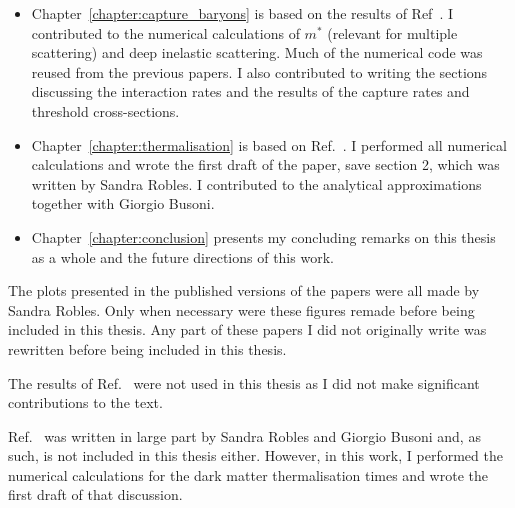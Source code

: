 \begin{preface}
\begin{itemize}
    \item Chapter~\ref{chapter:capture_baryons} is based on the results of Ref~\cite{Anzuini:2021lnv_nov_Improvedtreatmentdark}. I contributed to the numerical calculations of $m^*$ (relevant for multiple scattering) and deep inelastic scattering. Much of the numerical code was reused from the previous papers. I also contributed to writing the sections discussing the interaction rates and the results of the capture rates and threshold cross-sections. 
    \item Chapter~\ref{chapter:thermalisation} is based on Ref.~\cite{Bell:2023ysh_dec_ThermalizationAnnihilationDark}. I performed all numerical calculations and wrote the first draft of the paper, save section 2, which was written by Sandra Robles. I contributed to the analytical approximations together with Giorgio Busoni.
    \item Chapter~\ref{chapter:conclusion} presents my concluding remarks on this thesis as a whole and the future directions of this work.
\end{itemize}
The plots presented in the published versions of the papers were all made by Sandra Robles. Only when necessary were these figures remade before being included in this thesis.
Any part of these papers I did not originally write was rewritten before being included in this thesis. 

The results of Ref.~\cite{Bell:2020obw_sep_NucleonStructureStrong} were not used in this thesis as I did not make significant contributions to the text.

Ref.~\cite{Bell:2024qmj_apr_HeavyDarkMatter} was written in large part by Sandra Robles and Giorgio Busoni and, as such, is not included in this thesis either. However, in this work, I performed the numerical calculations for the dark matter thermalisation times and wrote the first draft of that discussion.
\end{preface}
